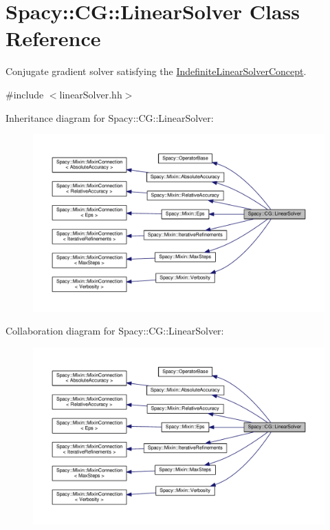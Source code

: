 \hypertarget{classSpacy_1_1CG_1_1LinearSolver}{}\section{Spacy\+:\+:C\+G\+:\+:Linear\+Solver Class Reference}
\label{classSpacy_1_1CG_1_1LinearSolver}


Conjugate gradient solver satisfying the \hyperlink{group__ConceptGroup_ga582dd34334cdecc7b27883f4e8239490_IndefiniteLinearSolverConceptAnchor}{Indefinite\+Linear\+Solver\+Concept}.  




{\ttfamily \#include $<$linear\+Solver.\+hh$>$}



Inheritance diagram for Spacy\+:\+:C\+G\+:\+:Linear\+Solver\+:\nopagebreak
\begin{figure}[H]
\begin{center}
\leavevmode
\includegraphics[width=350pt]{classSpacy_1_1CG_1_1LinearSolver__inherit__graph}
\end{center}
\end{figure}


Collaboration diagram for Spacy\+:\+:C\+G\+:\+:Linear\+Solver\+:\nopagebreak
\begin{figure}[H]
\begin{center}
\leavevmode
\includegraphics[width=350pt]{classSpacy_1_1CG_1_1LinearSolver__coll__graph}
\end{center}
\end{figure}
